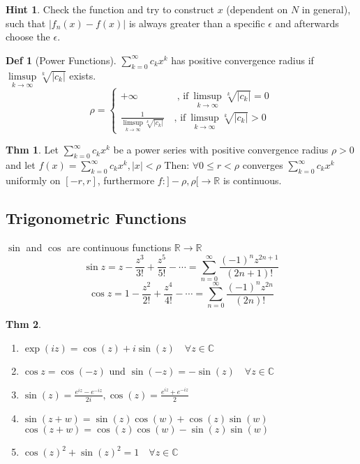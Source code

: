 \documentclass[a4paper, 10pt]{article}
\theoremstyle{definition}
\newtheorem*{theorem}{Thm}
\newtheorem*{definition}{Def}
\newtheorem*{note_wrapper}{Hint}
\theoremstyle{ex}
\theoremstyle{named}
\newenvironment{note}%
    {\begin{mdframed}[style=trick]\begin{note_wrapper}}%
    {\end{note_wrapper}\end{mdframed}}
\newcommand{\R}{\mathbb{R}}
\newcommand{\C}{\mathbb{C}}
\begin{document}
\begin{note}
    Check the function and try to construct $x$ (dependent on $N$ in general), such that $|f_n(x) - f(x)|$ is always greater than a specific $\epsilon$ and afterwards choose the $\epsilon$.
\end{note}

\begin{definition}[Power Functions]
    $\sum_{k = 0}^\infty c_k x^k$ has positive convergence radius if $\underset{k \to \infty}{\limsup} \sqrt[k]{|c_k|}$ exists.
    $$\rho = \begin{cases}
        + \infty \quad \quad \quad \quad \text{, if} \ \underset{k \to \infty}{\limsup} \sqrt[k]{|c_k|} = 0 \\
        \frac{1}{\underset{k \to \infty}{\limsup} \sqrt[k]{|c_k|}} \quad \text{, if} \ \underset{k \to \infty}{\limsup} \sqrt[k]{|c_k|} > 0
    \end{cases}$$
\end{definition}

\begin{theorem}
    Let $\sum_{k=0}^\infty c_kx^k$ be a power series with positive convergence radius $\rho > 0$ and let $f(x) = \sum_{k=0}^\infty c_kx^k, |x| < \rho$ Then: $\forall 0 \leq r < \rho$ converges $\sum_{k=0}^\infty c_kx^k$ uniformly on $[-r,r]$, furthermore  $f: ]-\rho, \rho[ \to \mathbb{R}$ is continuous.
\end{theorem}

\subsection{Trigonometric Functions}
$\sin$ and $\cos$ are continuous functions $\R \to \R$
$$\sin z = z - \frac{z^3}{3!} + \frac{z^5}{5!} - \cdots = \sum_{n = 0}^\infty \frac{(-1)^n z^{2n + 1}}{(2n + 1)!}$$
$$\cos z = 1 - \frac{z^2}{2!} + \frac{z^4}{4!} - \cdots = \sum_{n = 0}^\infty \frac{(-1)^n z^{2n}}{(2n)!}$$

\begin{theorem}
    \begin{enumerate}
        \item $\exp(iz) = \cos(z) +i\sin(z) \quad \forall z \in \C$
        \item $\cos z = \cos(-z) \text{ und } \sin(-z) = - \sin(z) \quad \forall z \in \C$
        \item $\sin(z) = \frac{e^{iz}-e^{-iz}}{2i}, \cos(z) = \frac{e^{iz}+e^{-iz}}{2}$
        \item $\sin(z+w) = \sin(z)\cos(w) + \cos(z)\sin(w)$ \\
            $\cos(z+w) = \cos(z)\cos(w) - \sin(z)\sin(w)$
        \item $\cos(z)^2+\sin(z)^2 = 1 \quad \forall z \in \mathbb{C}$
    \end{enumerate}
\end{theorem}
\end{document}
